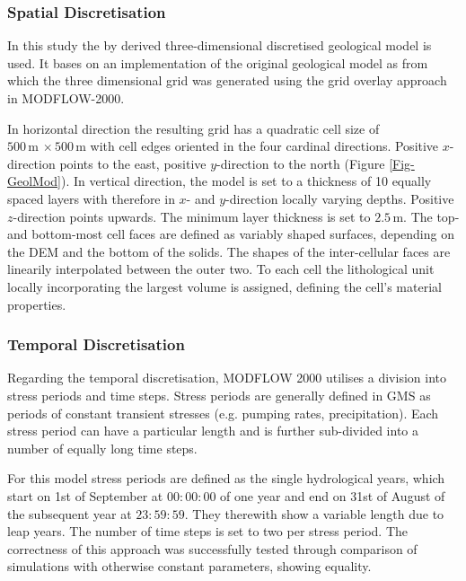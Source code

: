 \subsubsection{Spatial Discretisation}

In this study the by \cite{Horn.2021} derived three-dimensional discretised geological model is used. It bases on an implementation of the original geological model as from which the three dimensional grid was generated using the grid overlay approach in MODFLOW-2000.

In horizontal direction the resulting grid has a quadratic cell size of $500 \, \textrm{m} \, \times 500 \, \textrm{m}$ with cell edges oriented in the four cardinal directions. Positive $x$-direction points to the east, positive $y$-direction to the north (Figure \ref{Fig-GeolMod}). In vertical direction, the model is set to a thickness of 10 equally spaced layers with therefore in $x$- and $y$-direction locally varying depths. Positive $z$-direction points upwards. The minimum layer thickness is set to $2.5 \, \textrm{m}$. The top- and bottom-most cell faces are defined as variably shaped surfaces, depending on the DEM and the bottom of the solids. The shapes of the inter-cellular faces are linearily interpolated between the outer two. To each cell the lithological unit locally incorporating the largest volume is assigned, defining the cell's material properties.

\subsubsection{Temporal Discretisation}

Regarding the temporal discretisation, MODFLOW 2000 utilises a division into stress periods and time steps. Stress periods are generally defined in GMS as periods of constant transient stresses (e.g. pumping rates, precipitation). Each stress period can have a particular length and is further sub-divided into a number of equally long time steps.

For this model stress periods are defined as the single hydrological years, which start on 1st of September at ${00\!:\!00\!:\!00}$ of one year and end on 31st of August of the subsequent year at ${23\!:\!59\!:\!59}$. They therewith show a variable length due to leap years. The number of time steps is set to two per stress period. The correctness of this approach was successfully tested through comparison of simulations with otherwise constant parameters, showing equality.

